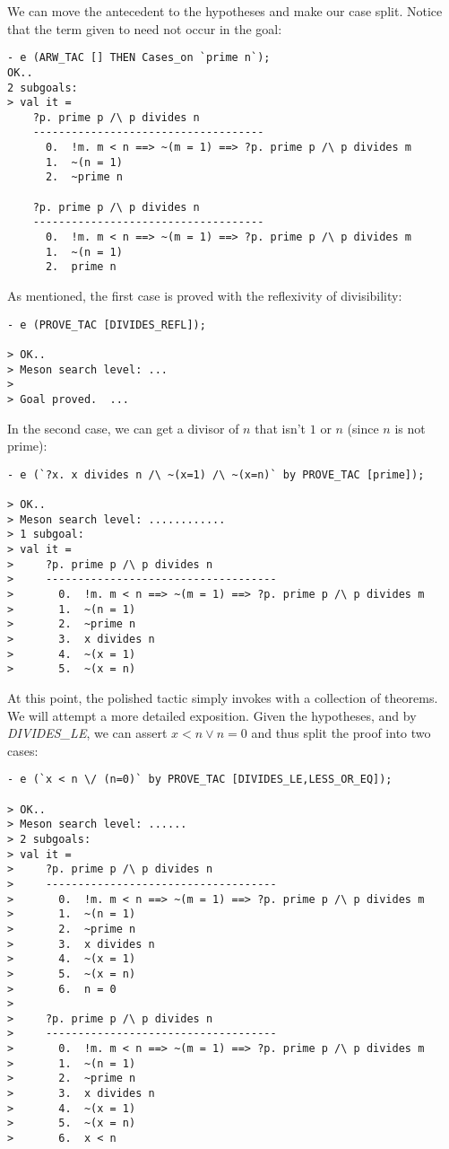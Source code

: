 We can move the antecedent to the hypotheses and make our case
split. Notice that the term given to  need not occur in
the goal:
\begin{session}\begin{verbatim}
- e (ARW_TAC [] THEN Cases_on `prime n`);
OK..
2 subgoals:
> val it =
    ?p. prime p /\ p divides n
    ------------------------------------
      0.  !m. m < n ==> ~(m = 1) ==> ?p. prime p /\ p divides m
      1.  ~(n = 1)
      2.  ~prime n

    ?p. prime p /\ p divides n
    ------------------------------------
      0.  !m. m < n ==> ~(m = 1) ==> ?p. prime p /\ p divides m
      1.  ~(n = 1)
      2.  prime n
\end{verbatim}\end{session}
\noindent As mentioned, the first case is proved with the reflexivity of
divisibility:
\begin{session}\begin{verbatim}
- e (PROVE_TAC [DIVIDES_REFL]);

> OK..
> Meson search level: ...
>
> Goal proved.  ...
\end{verbatim}\end{session}
\noindent
In the second case, we can get a divisor of $n$ that isn't $1$ or $n$
(since $n$ is not prime):
\begin{session}\begin{verbatim}
- e (`?x. x divides n /\ ~(x=1) /\ ~(x=n)` by PROVE_TAC [prime]);

> OK..
> Meson search level: ............
> 1 subgoal:
> val it =
>     ?p. prime p /\ p divides n
>     ------------------------------------
>       0.  !m. m < n ==> ~(m = 1) ==> ?p. prime p /\ p divides m
>       1.  ~(n = 1)
>       2.  ~prime n
>       3.  x divides n
>       4.  ~(x = 1)
>       5.  ~(x = n)
\end{verbatim}\end{session}
At this point, the polished tactic simply invokes  with
a collection of theorems. We will attempt a more detailed
exposition. Given the hypotheses, and by {\small\it DIVIDES\_LE}, we can
assert $x < n \lor n = 0$ and thus split the proof into two cases:
\begin{session}\begin{verbatim}
- e (`x < n \/ (n=0)` by PROVE_TAC [DIVIDES_LE,LESS_OR_EQ]);

> OK..
> Meson search level: ......
> 2 subgoals:
> val it =
>     ?p. prime p /\ p divides n
>     ------------------------------------
>       0.  !m. m < n ==> ~(m = 1) ==> ?p. prime p /\ p divides m
>       1.  ~(n = 1)
>       2.  ~prime n
>       3.  x divides n
>       4.  ~(x = 1)
>       5.  ~(x = n)
>       6.  n = 0
>
>     ?p. prime p /\ p divides n
>     ------------------------------------
>       0.  !m. m < n ==> ~(m = 1) ==> ?p. prime p /\ p divides m
>       1.  ~(n = 1)
>       2.  ~prime n
>       3.  x divides n
>       4.  ~(x = 1)
>       5.  ~(x = n)
>       6.  x < n
\end{verbatim}\end{session}

